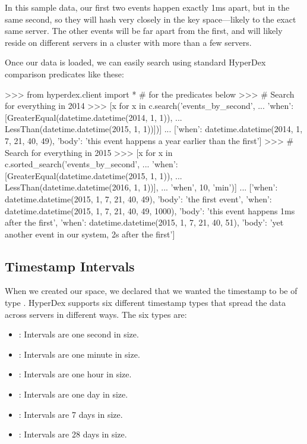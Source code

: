 In this sample data, our first two events happen exactly 1ms apart, but in the
same second, so they will hash very closely in the key space---likely to the
exact same server.  The other events will be far apart from the first, and will
likely reside on different servers in a cluster with more than a few servers.

Once our data is loaded, we can easily search using standard HyperDex
comparison predicates like these:

\begin{pythoncode}
>>> from hyperdex.client import * # for the predicates below
>>> # Search for everything in 2014
>>> [x for x in c.search('events_by_second',
...  {'when': [GreaterEqual(datetime.datetime(2014, 1, 1)),
...            LessThan(datetime.datetime(2015, 1, 1))]})]
...
[{'when': datetime.datetime(2014, 1, 7, 21, 40, 49),
  'body': 'this event happens a year earlier than the first'}]
>>> # Search for everything in 2015
>>> [x for x in c.sorted_search('events_by_second',
...  {'when': [GreaterEqual(datetime.datetime(2015, 1, 1)),
...            LessThan(datetime.datetime(2016, 1, 1))]},
...   'when', 10, 'min')]
...
[{'when': datetime.datetime(2015, 1, 7, 21, 40, 49),
  'body': 'the first event'},
 {'when': datetime.datetime(2015, 1, 7, 21, 40, 49, 1000),
  'body': 'this event happens 1ms after the first'},
 {'when': datetime.datetime(2015, 1, 7, 21, 40, 51),
  'body': 'yet another event in our system, 2s after the first'}]
\end{pythoncode}

\subsection{Timestamp Intervals}

When we created our space, we declared that we wanted the timestamp to be of
type .  HyperDex supports six different timestamp types
that spread the data across servers in different ways.  The six types are:

\begin{itemize}[noitemsep]
    \item {}:  Intervals are one second in size.
    \item {}:  Intervals are one minute in size.
    \item {}:  Intervals are one hour in size.
    \item {}:  Intervals are one day in size.
    \item {}:  Intervals are 7 days in size.
    \item {}:  Intervals are 28 days in size.
\end{itemize}

